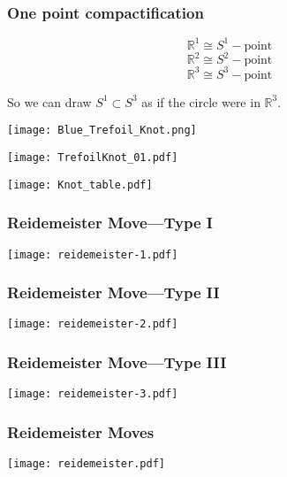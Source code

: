 \documentclass[14pt]{beamer}
\begin{document}
\begin{frame}
  \frametitle{One point compactification}

  \vfill
  $$\mathbb{R}^1 \cong S^1 - \mbox{point}$$
  \vfill\pause
  $$\mathbb{R}^2 \cong S^2 - \mbox{point}$$
  \vfill\pause
  $$\mathbb{R}^3 \cong S^3 - \mbox{point}$$
  \vfill\pause

  So we can draw $S^1 \subset S^3$ as if the circle were in
  $\mathbb{R}^3$.
\end{frame}



\begin{frame}
 \begin{center}
 \texttt{[image: Blue\_Trefoil\_Knot.png]}
 \end{center}
\end{frame}

\begin{frame}
\begin{center}
\texttt{[image: TrefoilKnot\_01.pdf]}
\end{center}
\end{frame}

\begin{frame}
\begin{center}
\texttt{[image: Knot\_table.pdf]}
\end{center}
\end{frame}

\begin{frame}
 \frametitle{Reidemeister Move---Type I}
 \begin{center}
   \texttt{[image: reidemeister-1.pdf]}
 \end{center}
\end{frame}

\begin{frame}
 \frametitle{Reidemeister Move---Type II}
 \begin{center}
   \texttt{[image: reidemeister-2.pdf]}
 \end{center}
\end{frame}

\begin{frame}
 \frametitle{Reidemeister Move---Type III}
 \begin{center}
   \texttt{[image: reidemeister-3.pdf]}
 \end{center}
\end{frame}

\begin{frame}
 \frametitle{Reidemeister Moves}
 \begin{center}
   \texttt{[image: reidemeister.pdf]}
 \end{center}
\end{frame}
\end{document}
